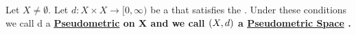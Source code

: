 \label{def:pseudometric}
\newcommand{\Pseudometric}[0]{
    \bf \hyperref[def:pseudometric]{Pseudometric} \rm
}
\newcommand{\PseudometricSpace}[0]{
    \bf \hyperref[def:pseudometric]{Pseudometric Space} \rm
}

\begin{df}[Pseudometric]
    Let $X \neq \emptyset$. 
    Let $d:X \times X \to [0,\infty)$ be a \SymmetricMap that satisfies the \TriangleInequality.
    Under these conditions we call d a \Pseudometric on X and we call $\left( X,d\right)$ a \PseudometricSpace.
    \end{df} 